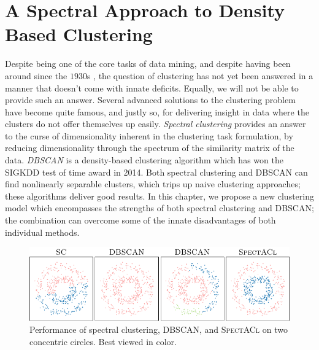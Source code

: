 \chapter{A Spectral Approach to Density Based Clustering}
\label{chap:Spectacl}
Despite being one of the core tasks of data mining, and despite having been around since the $1930$s \citep{driver1932quantitative,klimek1935culture,tryon1939cluster}, the question of clustering has not yet been answered in a
manner that doesn't come with innate deficits. Equally, we will not be able to provide such an answer. Several advanced solutions to the clustering problem have become quite famous, and justly so, for delivering insight in data where the clusters do not offer themselves up easily.  \emph{Spectral clustering} provides an answer to the curse of dimensionality
inherent in the clustering task formulation, by reducing dimensionality through the spectrum of the
similarity matrix of the data.  \emph{DBSCAN} \citep{ester1996density} is a density-based clustering algorithm 
which has won the SIGKDD test of time award in 2014.  Both spectral clustering and DBSCAN can find 
nonlinearly separable clusters, which trips up naive clustering approaches; these algorithms deliver 
good results. In this chapter, we propose a new clustering model which encompasses the strengths of both 
spectral clustering and DBSCAN; the combination can overcome some of the innate disadvantages of both 
individual methods.
\begin{figure}[t]
\centering
\includegraphics[width=\linewidth]{pics/SAIntroCircles.pdf}
%
\caption{Performance of spectral clustering, DBSCAN, and \textsc{SpectACl} on two concentric circles. Best viewed in color.}
\label{fig:intro}
\end{figure}

